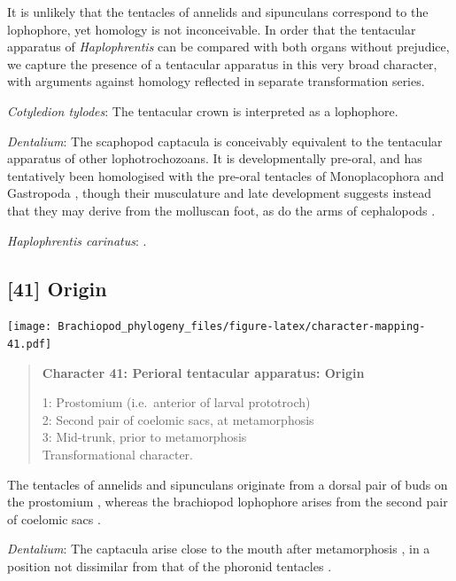 \documentclass[openany]{book}
\begin{document}
It is unlikely that the tentacles of annelids and sipunculans correspond
to the lophophore, yet homology is not inconceivable. In order that the
tentacular apparatus of \emph{Haplophrentis} can be compared with both
organs without prejudice, we capture the presence of a tentacular
apparatus in this very broad character, with arguments against homology
reflected in separate transformation series.

\hypertarget{Cotyledion_tylodes-coding-40}{}
\emph{Cotyledion tylodes}: The tentacular crown \citep{Zhang2013} is
interpreted as a lophophore.

\hypertarget{Dentalium-coding-40}{}
\emph{Dentalium}: The scaphopod captacula is conceivably equivalent to
the tentacular apparatus of other lophotrochozoans. It is
developmentally pre-oral, and has tentatively been homologised with the
pre-oral tentacles of Monoplacophora and Gastropoda \citep{Steiner1992},
though their musculature and late development suggests instead that they
may derive from the molluscan foot, as do the arms of cephalopods
\citep{Wanninger2002M}.

\hypertarget{Haplophrentis_carinatus-coding-40}{}
\emph{Haplophrentis carinatus}: \citet{Moysiuk2017Hyolithsare}.

\subsection*{{[}41{]} Origin}\label{origin}

\texttt{[image: Brachiopod\_phylogeny\_files/figure-latex/character-mapping-41.pdf]}

\begin{quote}
\textbf{Character 41: Perioral tentacular apparatus: Origin}

1: Prostomium (i.e.~anterior of larval prototroch)\\
2: Second pair of coelomic sacs, at metamorphosis\\
3: Mid-trunk, prior to metamorphosis\\
Transformational character.
\end{quote}

The tentacles of annelids and sipunculans originate from a dorsal pair
of buds on the prostomium \citep{Adrianov2006}, whereas the brachiopod
lophophore arises from the second pair of coelomic sacs
\citep{Nielsen1991}.

\hypertarget{Dentalium-coding-41}{}
\emph{Dentalium}: The captacula arise close to the mouth after
metamorphosis \citep{Wanninger2002M}, in a position not dissimilar from
that of the phoronid tentacles \citep{Santagata2004}.
\end{document}
